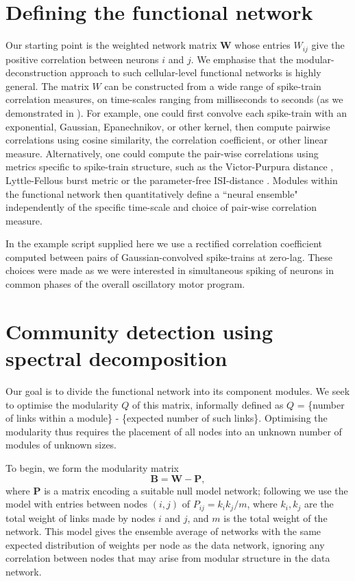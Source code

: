 \documentclass[11pt,a4paper]{article}
\begin{document}
\section{Defining the functional network}
Our starting point is the weighted network matrix $\mathbf{W}$ whose entries $W_{ij}$ give the positive correlation between neurons $i$ and $j$. We emphasise that the modular-deconstruction approach to such cellular-level functional networks is highly general. The matrix $W$ can be constructed from a wide range of spike-train correlation measures, on time-scales ranging from milliseconds to seconds (as we demonstrated in \citep{Humphries2011}). For example, one could first convolve each spike-train with an exponential, Gaussian, Epanechnikov, or other kernel, then compute pairwise correlations using cosine similarity, the correlation coefficient, or other linear measure. Alternatively, one could compute the pair-wise correlations using metrics specific to spike-train structure, such as the Victor-Purpura distance \citep{Victor1996}, Lyttle-Fellous burst metric \citep{Lyttle2011} or the parameter-free ISI-distance \citep{Kreuz2007}. Modules within the functional network then quantitatively define a ``neural ensemble" independently of the specific time-scale and choice of pair-wise correlation measure.

In the example script supplied here we use a rectified correlation coefficient computed between pairs of Gaussian-convolved spike-trains at zero-lag. These choices were made as we were interested in simultaneous spiking of neurons in common phases of the overall oscillatory motor program.

\section{Community detection using spectral decomposition}
Our goal is to divide the functional network into its component modules. We seek to optimise the modularity $Q$ of this matrix, informally defined as $Q$ = \{number of links within a module\} - \{expected number of such links\}. Optimising the modularity thus requires the placement of all nodes into an unknown number of modules of unknown sizes.

To begin, we form the modularity matrix \citep{Newman2006a}
\begin{equation}
\mathbf{B} = \mathbf{W} - \mathbf{P},
\end{equation}
where $\mathbf{P}$ is a matrix encoding a suitable null model network; following \citep{Newman2006a,Humphries2011} we use the model with entries between nodes $(i,j)$ of $P_{ij} = k_i k_j / m$, where $k_i, k_j$ are the total weight of links made by nodes $i$ and $j$, and $m$ is the total weight of the network. This model gives the ensemble average of networks with the same expected distribution of weights per node as the data network, ignoring any correlation between nodes that may arise from modular structure in the data network.
\end{document}
